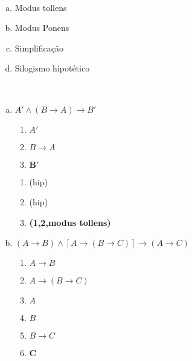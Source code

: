 \begin{Gabarito}{10}
~

    \begin{multicols}{2}
      \begin{enumerate}[a)]
        \item Modus tollens
        \item Modus Ponens
        \item Simplificação
        \item Silogismo hipotético
      \end{enumerate}
    \end{multicols}
  
\end{Gabarito}
\begin{Gabarito}{11}
~

    \begin{enumerate}[a)]
      \item $A' \wedge (B \rightarrow A) \rightarrow B'$
      \begin{multicols}{2}

        \begin{enumerate}[1.]
          \item $A'$
          \item $B \rightarrow A$
          \item $\boldsymbol{B'}$
        \end{enumerate}

        \columnbreak

        \begin{enumerate}[\ding{32}]
          \item (hip)
          \item (hip)
          \item \textbf{(1,2,modus tollens)}
        \end{enumerate}

        \end{multicols}

      \item $(A \rightarrow B) \wedge [A \rightarrow (B \rightarrow C)] \rightarrow (A \rightarrow C)$ \\
      \begin{multicols}{2}

        \begin{enumerate}[1.]
          \item $A \rightarrow B$
          \item $A \rightarrow (B \rightarrow C)$
          \item $A$
          \item $B$
          \item $B \rightarrow C$
          \item $\boldsymbol{C}$
        \end{enumerate}


\end{multicols}
\end{enumerate}
\end{Gabarito}
